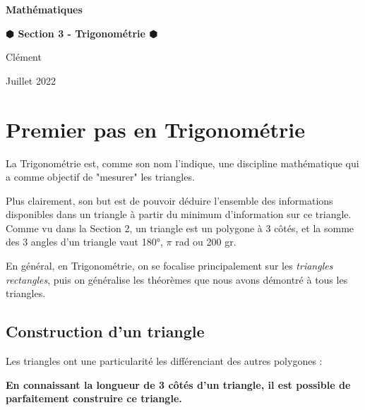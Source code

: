 \documentclass[a4paper]{article}
\begin{document}
	\begin{titlepage}
		\begin{center}
		
			\Huge	 \textbf{Mathématiques}\\
			\bigskip \smallskip
		
			\Large	 \textbf{$\varhexagonblack$ Section 3 - Trigonométrie $\varhexagonblack$}\\
			\bigskip
		
			\large	 Clément   \\ 
			\smallskip
		
			\normalfont	Juillet 2022\\
		
		\end{center}
		
		\doublespacing
		\tableofcontents
		\singlespacing

	\end{titlepage}





	\section{Premier pas en Trigonométrie}

		La Trigonométrie est, comme son nom l'indique, une discipline mathématique qui a comme objectif de "mesurer" les triangles.

		Plus clairement, son but est de pouvoir déduire l'ensemble des informations disponibles dans un 
		triangle à partir du minimum d'information sur ce triangle.
		Comme vu dans la Section 2, un triangle est un polygone à 3 côtés, 
		et la somme des 3 angles d'un triangle vaut 180°, $\pi$ rad ou 200 gr.

		En général, en Trigonométrie, on se focalise principalement sur les \textit{triangles rectangles}, 
		puis on généralise les théorèmes que nous avons démontré à tous les triangles.

		\subsection{Construction d'un triangle}
	
			Les triangles ont une particularité les différenciant des autres polygones :

			\textbf{En connaissant la longueur de 3 côtés d'un triangle, il est possible de parfaitement construire ce triangle.}
\end{document}
